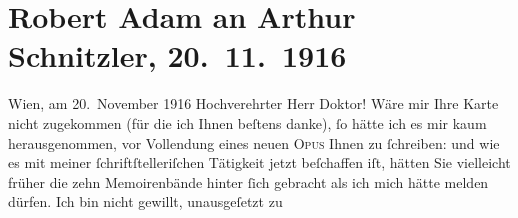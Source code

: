 

         
         \renewcommand{\erwaehntePersonen}{Personen: Robert Adam, Peter Gast, Max Kemmerich, Friedrich Nietzsche, Romain Rolland}
         \renewcommand{\erwaehnteInstitutionen}{Institutionen: Nobelpreis}
         \renewcommand{\erwaehnteOrte}{Orte: Frankreich, Wien, XII., Meidling}
         \renewcommand{\erwaehnteWerke}{Werke: Jean Christophe, Meine Memoiren, Märchenkomödie, Prophezeiungen – Wahn oder Wirklichkeit?, Wilhelm Meister, Wundervogel}
               \section[Robert Adam an Arthur Schnitzler, 20. 11. 1916]{ Robert Adam an Arthur Schnitzler, 20. 11. 1916}\nopagebreak{}\rehead{ }\begin{ledgroupsized}[t]{13cm}\normalsize\beginnumbering{} \toendnotes[C]{\smallbreak\pagebreak[2]} 
\toendnotes[C]{\smallbreak}\pstart
           \raggedleft{}{\pb}Wien, am 20. November 1916\pend
           \pstart{}Hochverehrter Herr Doktor!\pend\pstart
           Wäre mir Ihre Karte nicht zugekommen (für die ich Ihnen beſtens danke), ſo hätte ich
               es mir kaum herausgenommen, vor Vollendung eines neuen \textsc{Opus}
               Ihnen zu ſchreiben: und wie es mit meiner ſchriftſtelleriſchen Tätigkeit jetzt
               beſchaffen iſt,  hätten Sie vielleicht früher die
               zehn Memoirenbände hinter ſich
               gebracht als ich mich hätte melden dürfen. Ich bin nicht gewillt, unausgeſetzt zu

\end{ledgroupsized}
